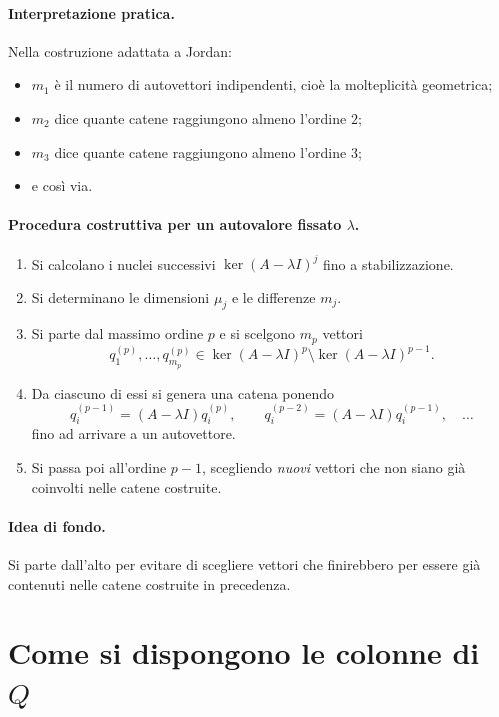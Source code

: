 \paragraph{Interpretazione pratica.}
Nella costruzione adattata a Jordan:
\begin{itemize}
    \item $m_1$ è il numero di autovettori indipendenti, cioè la molteplicità geometrica;
    \item $m_2$ dice quante catene raggiungono almeno l'ordine $2$;
    \item $m_3$ dice quante catene raggiungono almeno l'ordine $3$;
    \item e così via.
\end{itemize}

\paragraph{Procedura costruttiva per un autovalore fissato $\lambda$.}
\begin{enumerate}
    \item Si calcolano i nuclei successivi $\ker(A-\lambda I)^j$ fino a stabilizzazione.
    \item Si determinano le dimensioni $\mu_j$ e le differenze $m_j$.
    \item Si parte dal massimo ordine $p$ e si scelgono $m_p$ vettori
    \[
    q_1^{(p)},\dots,q_{m_p}^{(p)}\in \ker(A-\lambda I)^p\setminus \ker(A-\lambda I)^{p-1}.
    \]
    \item Da ciascuno di essi si genera una catena ponendo
    \[
    q_i^{(p-1)}=(A-\lambda I)q_i^{(p)},\qquad
    q_i^{(p-2)}=(A-\lambda I)q_i^{(p-1)},\quad \dots
    \]
    fino ad arrivare a un autovettore.
    \item Si passa poi all'ordine $p-1$, scegliendo \emph{nuovi} vettori che non siano già coinvolti nelle catene costruite.
\end{enumerate}

\paragraph{Idea di fondo.}
Si parte dall'alto per evitare di scegliere vettori che finirebbero per essere già contenuti nelle catene costruite in precedenza.

\section{Come si dispongono le colonne di \texorpdfstring{$Q$}{Q}}


